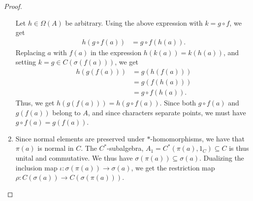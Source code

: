 \documentclass[10pt]{mypackage}
\begin{document}
\begin{proof}
\begin{enumerate}[(1)]
      Let $h\in \Omega\left(A\right)$ be arbitrary. Using the above expression with $k = g\circ f$, we get
      \begin{align*}
        h\left(g\circ f(a)\right) &= g\circ f\left(h(a)\right).
      \end{align*}
      Replacing $a$ with $f(a)$ in the expression $h\left(k\left(a\right)\right) = k\left(h\left(a\right)\right)$, and setting $k = g\in C\left(\sigma\left(f\left(a\right)\right)\right)$, we get
      \begin{align*}
        h\left(g\left(f\left(a\right)\right)\right) &= g\left(h\left(f\left(a\right)\right)\right)\\
                                                    &= g\left(f\left(h\left(a\right)\right)\right)\\
                                                    &= g\circ f\left(h\left(a\right)\right).
      \end{align*}
      Thus, we get $h\left(g\left(f\left(a\right)\right)\right) = h\left(g\circ f\left(a\right)\right)$. Since both $g\circ f(a)$ and $g\left(f\left(a\right)\right)$ belong to $A$, and since characters separate points, we must have $g\circ f\left(a\right) = g\left(f\left(a\right)\right)$.
    \item Since normal elements are preserved under $\ast$-homomorphisms, we have that $\pi\left(a\right)$ is normal in $C$. The $C^{\ast}$-subalgebra, $A_1 = C^{\ast}\left(\pi\left(a\right),1_C\right)\subseteq C$ is thus unital and commutative. We thus have $\sigma\left(\pi\left(a\right)\right)\subseteq \sigma\left(a\right)$. Dualizing the inclusion map $\iota\colon \sigma\left(\pi\left(a\right)\right)\rightarrow \sigma\left(a\right)$, we get the restriction map $\rho\colon C\left(\sigma\left(a\right)\right)\rightarrow C\left(\sigma\left(\pi\left(a\right)\right)\right)$.\newline


\end{enumerate}
\end{proof}
\end{document}
